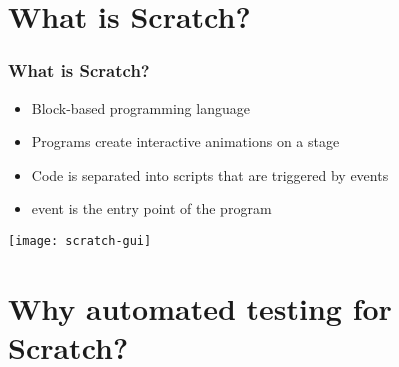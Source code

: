 \section{What is Scratch?}

\begin{frame}
\end{frame}


\begin{frame}\frametitle{What is Scratch?}
    \begin{itemize}
        \item \textcolor{upfim}{Block-based} programming language
        \item Programs create \textcolor{upfim}{interactive animations} on a stage
        \item Code is separated into scripts that are triggered by events
        \item \greenflag event is the entry point of the program
    \end{itemize}
    \centering
    \medskip
    \texttt{[image: scratch-gui]}
\end{frame}


\section{Why automated testing for Scratch?}

\begin{frame}
\end{frame}

